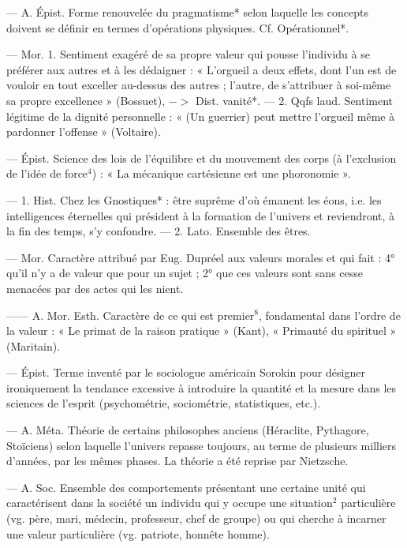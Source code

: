 \begin{itemize}[leftmargin=1cm, label=, itemsep=1pt]
 — A. Épist. Forme
renouvelée du pragmatisme* selon
laquelle les concepts doivent se
définir en termes d'opérations
physiques. Cf. Opérationnel*.

 — Mor. 1. Sentiment exagéré de sa propre valeur qui pousse
l'individu à se préférer aux autres
et à les dédaigner : « L’orgueil a
deux effets, dont l’un est de vouloir en tout exceller au-dessus des
autres ; l’autre, de s’attribuer à
soi-même sa propre excellence »
(Bossuet), $->$ Dist. vanité*. —
2. Qqfs laud. Sentiment légitime
de la dignité personnelle : « (Un
guerrier) peut mettre l’orgueil
même à pardonner l'offense »
(Voltaire).

 — Épist. Science des
lois de l'équilibre et du mouvement des corps (à l’exclusion de
l’idée de force$^4$) : « La mécanique
cartésienne est une phoronomie ».

 — 1. Hist. Chez les Gnostiques* : être suprême d'où émanent les éons, i.e. les intelligences
éternelles qui président à la formation de l’univers et reviendront,
à la fin des temps, s’y confondre.
— 2. Lato. Ensemble des êtres.

 — Mor. Caractère attribué
par Eug. Dupréel aux valeurs
morales et qui fait : 4° qu'il n’y a
de valeur que pour un sujet ; 2°
que ces valeurs sont sans cesse
menacées par des actes qui les
nient.

 —— A. Mor. Esth.
Caractère de ce qui est premier$^8$,
fondamental dans l’ordre de la
valeur : « Le primat de la raison
pratique » (Kant), « Primauté du
spirituel » (Maritain).

 — Épist. Terme inventé par le sociologue américain
Sorokin pour désigner ironiquement la tendance excessive à introduire la quantité et la mesure dans
les sciences de l'esprit (psychométrie, sociométrie, statistiques,
etc.).

 — A. Méta. Théorie
de certains philosophes anciens
(Héraclite, Pythagore, Stoïciens)
selon laquelle l'univers repasse
toujours, au terme de plusieurs
milliers d'années, par les mêmes
phases. La théorie a été reprise
par Nietzsche.

 — A. Soc. Ensemble des
comportements présentant une
certaine unité qui caractérisent
dans la société un individu qui y
occupe une situation$^2$ particulière
(vg. père, mari, médecin, professeur, chef de groupe) ou qui
cherche à incarner une valeur
particulière (vg. patriote, honnête
homme).


\end{itemize}
